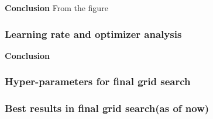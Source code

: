 \textbf{Conclusion}
From the figure 


\subsubsection{Learning rate and optimizer analysis}


\textbf{Conclusion} 


\subsubsection{Hyper-parameters for final grid search}

\subsubsection{Best results in final grid search(as of now)}



